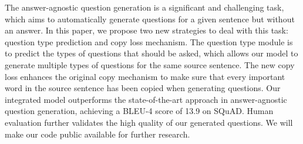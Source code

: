 The answer-agnostic question generation is a significant and challenging task, which aims to automatically generate questions for a given sentence but without an answer. In this paper, we propose two new strategies to deal with this task: question type prediction and copy loss mechanism. The question type module is to predict the types of questions that should be asked, which allows our model to generate multiple types of questions for the same source sentence. The new copy loss enhances the original copy mechanism to make sure that every important word in the source sentence has been copied when generating questions. Our integrated model outperforms the state-of-the-art approach in answer-agnostic question generation, achieving a BLEU-4 score of 13.9 on SQuAD. Human evaluation further validates the high quality of our generated questions. We will make our code public available for further research.
